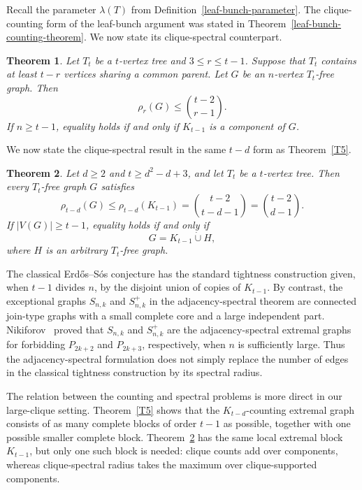 \documentclass[11pt,a4paper]{article}
\newtheorem{theorem}{Theorem}[section]
\newcommand{\dunion}{\mathbin{\dot\cup}}
\begin{document}
Recall the parameter $\lambda(T)$ from Definition~\ref{leaf-bunch-parameter}. The clique-counting form of the leaf-bunch argument was stated in Theorem~\ref{leaf-bunch-counting-theorem}. We now state its clique-spectral counterpart.

\begin{theorem}\label{leaf-bunch-spectral-theorem}
Let $T_t$ be a $t$-vertex tree and $3\le r\le t-1$. Suppose that $T_t$ contains at least $t-r$ vertices sharing a common parent.
Let $G$ be an $n$-vertex $T_t$-free graph. Then
\begin{equation}\label{leaf-bunch-criterion-bound}
\rho_r(G)\le\binom{t-2}{r-1}.
\end{equation}
If $n\ge t-1$, equality holds if and only if $K_{t-1}$ is a component of $G$.
\end{theorem}

We now state the clique-spectral result in the same $t-d$ form as Theorem~\ref{T5}.

\begin{theorem}\label{spectral-T5}
Let $d\ge2$ and $t\ge d^2-d+3$, and let $T_t$ be a $t$-vertex tree. Then every $T_t$-free graph $G$ satisfies
\[
\rho_{t-d}(G)
\le \rho_{t-d}(K_{t-1})
=\binom{t-2}{t-d-1}
=\binom{t-2}{d-1}.
\]
If $|V(G)|\ge t-1$, equality holds if and only if
\[
G=K_{t-1}\dunion H,
\]
where $H$ is an arbitrary $T_t$-free graph.
\end{theorem}

The classical Erd\H{o}s--S\'{o}s conjecture has the standard tightness construction given, when $t-1$ divides $n$, by the disjoint union of copies of $K_{t-1}$. By contrast, the exceptional graphs $S_{n,k}$ and $S_{n,k}^{+}$ in the adjacency-spectral theorem are connected join-type graphs with a small complete core and a large independent part. Nikiforov~\cite{Nikiforov2010paths} proved that $S_{n,k}$ and $S_{n,k}^{+}$ are the adjacency-spectral extremal graphs for forbidding $P_{2k+2}$ and $P_{2k+3}$, respectively, when $n$ is sufficiently large. Thus the adjacency-spectral formulation does not simply replace the number of edges in the classical tightness construction by its spectral radius.

The relation between the counting and spectral problems is more direct in our large-clique setting. Theorem~\ref{T5} shows that the $K_{t-d}$-counting extremal graph consists of as many complete blocks of order $t-1$ as possible, together with one possible smaller complete block. Theorem~\ref{spectral-T5} has the same local extremal block $K_{t-1}$, but only one such block is needed: clique counts add over components, whereas clique-spectral radius takes the maximum over clique-supported components.
\end{document}
